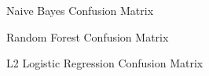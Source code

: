 \documentclass[journal]{IEEEtran}
\begin{document}
\begin{figure}
    \centering
    \caption{Naive Bayes Confusion Matrix}
    \label{fig:nb}
\end{figure}

\begin{figure}
    \centering
    \caption{Random Forest Confusion Matrix}
    \label{fig:rf}
\end{figure}

\begin{figure}
    \centering
    \caption{L2 Logistic Regression Confusion Matrix}
    \label{fig:logReg}
\end{figure}
\end{document}
